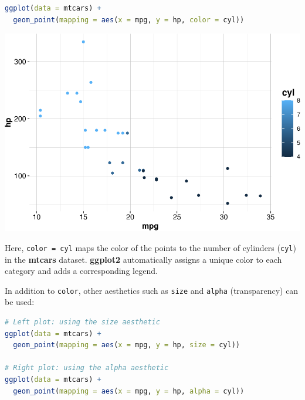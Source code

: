 \documentclass[
]{book}
\newcommand{\passthrough}[1]{#1}
\theoremstyle{definition}
\theoremstyle{definition}
\theoremstyle{definition}
\theoremstyle{definition}
\theoremstyle{remark}
\begin{document}
\begin{lstlisting}[language=R]
ggplot(data = mtcars) +
  geom_point(mapping = aes(x = mpg, y = hp, color = cyl))
\end{lstlisting}

\begin{center}\includegraphics{Intro-R_files/figure-latex/unnamed-chunk-37-1} \end{center}

Here, \passthrough{\lstinline!color = cyl!} maps the color of the points to the number of cylinders (\passthrough{\lstinline!cyl!}) in the \textbf{mtcars} dataset. \textbf{ggplot2} automatically assigns a unique color to each category and adds a corresponding legend.

In addition to \passthrough{\lstinline!color!}, other aesthetics such as \passthrough{\lstinline!size!} and \passthrough{\lstinline!alpha!} (transparency) can be used:

\begin{lstlisting}[language=R]
# Left plot: using the size aesthetic
ggplot(data = mtcars) +
  geom_point(mapping = aes(x = mpg, y = hp, size = cyl))

# Right plot: using the alpha aesthetic
ggplot(data = mtcars) +
  geom_point(mapping = aes(x = mpg, y = hp, alpha = cyl))
\end{lstlisting}
\end{document}
